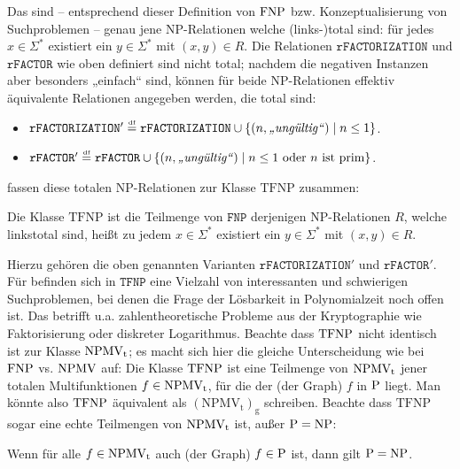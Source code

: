 Das sind – entsprechend dieser Definition von $\FNP$ bzw. Konzeptualisierung von Suchproblemen – genau jene NP-Relationen welche (links-)total sind: für jedes $x\in\Sigma^*$ existiert ein $y\in\Sigma^*$ mit $(x,y)\in R$. 
Die Relationen $\mathtt{rFACTORIZATION}$ und $\mathtt{rFACTOR}$ wie oben definiert sind nicht total; nachdem die negativen Instanzen aber besonders „einfach“ sind, können für beide NP-Relationen effektiv äquivalente Relationen angegeben werden, die total sind:
\begin{itemize} \item $\mathtt{rFACTORIZATION}' \defeq \mathtt{rFACTORIZATION} \cup \{ (n, \text{\emph{„ungültig“}}) \mid n\leq 1 \}$.
    \item $\mathtt{rFACTOR}' \defeq \mathtt{rFACTOR} \cup \{ (n, \text{\emph{„ungültig“}}) \mid n\leq 1 \text{ oder $n$ ist prim} \}$.
\end{itemize}
\textcite{megiddo_total_1991} fassen diese totalen NP-Relationen zur Klasse $\mathrm{TFNP}$ zusammen:
\begin{definition}
    Die Klasse $\mathrm{TFNP}$ ist die Teilmenge von $\mathtt{FNP}$ derjenigen NP-Relationen $R$, welche linkstotal sind, heißt zu jedem $x\in\Sigma^*$ existiert ein $y\in\Sigma^*$ mit $(x,y)\in R$.
\end{definition}
Hierzu gehören die oben genannten Varianten $\mathtt{rFACTORIZATION}'$ und $\mathtt{rFACTOR}'$.
Für \citeauthor{megiddo_total_1991} befinden sich in $\mathtt{TFNP}$ eine Vielzahl von interessanten und schwierigen Suchproblemen, bei denen die Frage der Lösbarkeit in Polynomialzeit noch offen ist.
Das betrifft u.a. zahlentheoretische Probleme aus der Kryptographie wie Faktorisierung oder diskreter Logarithmus. Beachte dass $\TFNP$ nicht identisch ist zur Klasse $\NPMVt$; es macht sich hier die gleiche Unterscheidung wie bei $\FNP$ vs. $\NPMV$ auf: Die Klasse $\TFNP$ ist eine Teilmenge von $\NPMVt$ jener totalen Multifunktionen $f\in\NPMVt$, für die der (der Graph) $f$ in $\P$ liegt. Man könnte also $\TFNP$ äquivalent als $\mathrm{(NPMV_{t})_{g}}$ schreiben.
Beachte dass $\mathrm{TFNP}$ sogar eine echte Teilmengen von $\NPMVt$ ist, außer $\P=\NP$:
\begin{observation}\label{obs:npmvt-properin-tfnp}
    Wenn für alle $f\in\NPMVt$ auch (der Graph) $f\in \P$ ist, dann gilt $\P=\NP$.
\end{observation}
